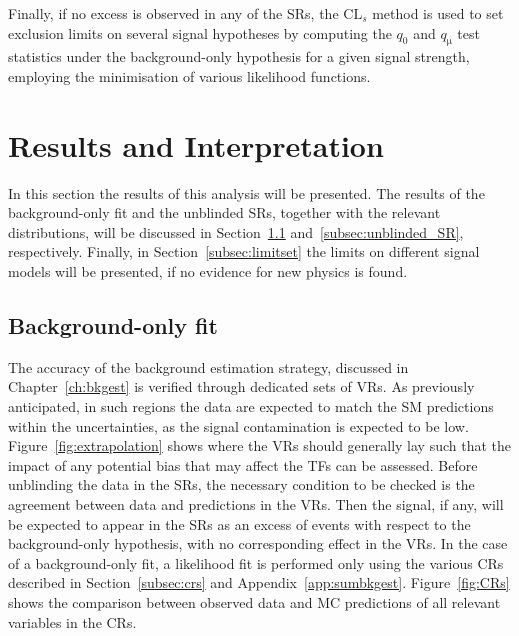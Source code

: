 				Finally, if no excess is observed in any of the \acp{SR}, the $\mathrm{CL}_s$ method is used to set exclusion limits on several signal hypotheses by computing the $q_0$ and $q_{\mathrm{\mu}}$ test statistics under the background-only hypothesis for a given signal strength, employing the minimisation of various likelihood functions. %



	\section{Results and Interpretation}
	\label{sec:results}

		In this section the results of this analysis will be presented. The results of the background-only fit and the unblinded \acp{SR}, together with the relevant distributions, will be discussed in Section~\ref{subsec:bkgonly_fit} and~\ref{subsec:unblinded_SR}, respectively. Finally, in Section~\ref{subsec:limitset} the limits on different signal models will be presented, if no evidence for new physics is found.

 		\subsection{Background-only fit}
 		\label{subsec:bkgonly_fit}

 			The accuracy of the background estimation strategy, discussed in Chapter~\ref{ch:bkgest} is verified through dedicated sets of \acp{VR}. As previously anticipated, in such regions the data are expected to match the \ac{SM} predictions within the uncertainties, as the signal contamination is expected to be low. Figure~\ref{fig:extrapolation} shows where the VRs should generally lay such that the impact of any potential bias that may affect the \acp{TF} can be assessed. Before unblinding the data in the \acp{SR}, the necessary condition to be checked is the agreement between data and predictions in the \acp{VR}. Then the signal, if any, will be expected to appear in the \acp{SR} as an excess of events with respect to the background-only hypothesis, with no corresponding effect in the \acp{VR}. In the case of a background-only fit, a likelihood fit is performed only using the various \acp{CR} described in Section~\ref{subsec:crs} and Appendix~\ref{app:sumbkgest}. Figure~\ref{fig:CRs} shows the comparison between observed data and \ac{MC} predictions of all relevant variables in the \acp{CR}.
		
